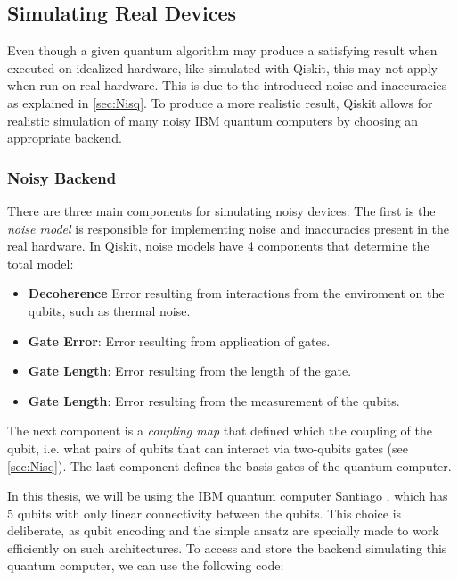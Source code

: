 \subsection{Simulating Real Devices}\label{sec:Simulating Real Devices}

Even though a given quantum algorithm may produce a satisfying result when executed on idealized hardware, like simulated with Qiskit, this may not apply when run on real hardware. This is due to the introduced noise and inaccuracies as explained in \cref{sec:Nisq}. To produce a more realistic result, Qiskit allows for realistic simulation of many noisy IBM quantum computers by choosing an appropriate backend. 

\subsubsection*{Noisy Backend}

There are three main components for simulating noisy devices. The first is the \emph{noise model} is responsible for implementing noise and inaccuracies present in the real hardware. In Qiskit, noise models have 4 components that determine the total model:

\begin{itemize}
    \item \textbf{Decoherence} Error resulting from interactions from the enviroment on the qubits, such as thermal noise.
    \item \textbf{Gate Error}: Error resulting from application of gates.
    \item \textbf{Gate Length}: Error resulting from the length of the gate.
    \item \textbf{Gate Length}: Error resulting from the measurement of the qubits. 
\end{itemize}

The next component is a \emph{coupling map} that defined which the coupling of the qubit, i.e. what pairs of qubits that can interact via two-qubits gates (see \cref{sec:Nisq}). The last component defines the basis gates of the quantum computer. 

In this thesis, we will be using the IBM quantum computer Santiago \cite{santiago}, which has 5 qubits with only linear connectivity between the qubits. This choice is deliberate, as qubit encoding and the simple ansatz are specially made to work efficiently on such architectures. To access and store the backend simulating this quantum computer, we can use the following code:

